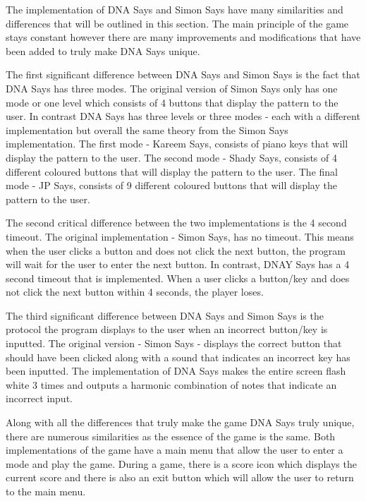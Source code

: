 \documentclass[12pt, titlepage]{article}
\begin{document}
\par The implementation of DNA Says and Simon Says have many similarities and differences that will be outlined in this section. The main principle of the game stays constant however there are many improvements and modifications that have been added to truly make DNA Says unique. 
\\
\par The first significant difference between DNA Says and Simon Says is the fact that DNA Says has three modes. The original version of Simon Says only has one mode or one level which consists of 4 buttons that display the pattern to the user. In contrast DNA Says has three levels or three modes - each with a different implementation but overall the same theory from the Simon Says implementation. The first mode - Kareem Says, consists of piano keys that will display the pattern to the user. The second mode - Shady Says, consists of 4 different coloured buttons that will display the pattern to the user. The final mode - JP Says, consists of 9 different coloured buttons that will display the pattern to the user. 
\\
\par The second critical difference between the two implementations is the 4 second timeout. The original implementation - Simon Says, has no timeout. This means when the user clicks a button and does not click the next button, the program will wait for the user to enter the next button. In contrast, DNAY Says has a 4 second timeout that is implemented. When a user clicks a button/key and does not click the next button within 4 seconds, the player loses.
\\
\par The third significant difference between DNA Says and Simon Says is the protocol the program displays to the user when an incorrect button/key is inputted. The original version - Simon Says - displays the correct button that should have been clicked along with a sound that indicates an incorrect key has been inputted. The implementation of DNA Says makes the entire screen flash white 3 times and outputs a harmonic combination of notes that indicate an incorrect input. 
\\
\par Along with all the differences that truly make the game DNA Says truly unique, there are numerous similarities as the essence of the game is the same. Both implementations of the game have a main menu that allow the user to enter a mode and play the game. During a game, there is a score icon which displays the current score and there is also an exit button which will allow the user to return to the main menu.  
\end{document}
